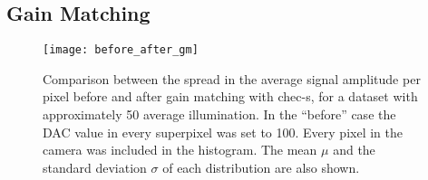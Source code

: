 \subsection{Gain Matching}

\begin{figure}
	\centering
    \texttt{[image: before\_after\_gm]} 
	\caption[Gain-Matching Residuals]{Comparison between the spread in the average signal amplitude per pixel before and after gain matching with \gls{chec-s}, for a dataset with approximately \SI{50}{\pe} average illumination. In the ``before'' case the DAC value in every superpixel was set to 100. Every pixel in the camera was included in the histogram. The mean $\mu$ and the standard deviation $\sigma$ of each distribution are also shown.} 
	\label{fig:before_after_gm}
\end{figure}


